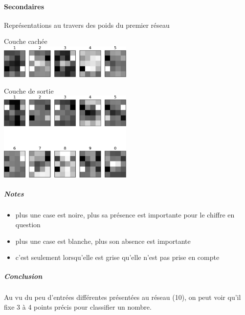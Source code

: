     \paragraph{Secondaires}
      Représentations au travers des poids du premier réseau
      \begin{center}
	Couche cachée \\
	\includegraphics[width=250px]{data/expA1/representation_hidden.png}
      \end{center}
      \begin{center}
	Couche de sortie \\
	\includegraphics[width=250px]{data/expA1/representation.png}
      \end{center} 
      \subparagraph{Notes}
	\begin{itemize}
	  \item plus une case est noire, plus sa présence est importante pour le chiffre en question
	  \item plus une case est blanche, plus son absence est importante
	  \item c'est seulement lorsqu'elle est grise qu'elle n'est pas prise en compte
	\end{itemize}
      \subparagraph{Conclusion}
        Au vu du peu d'entrées différentes présentées au réseau (10), on peut voir qu'il fixe 3 à 4 points précis
        pour classifier un nombre.
